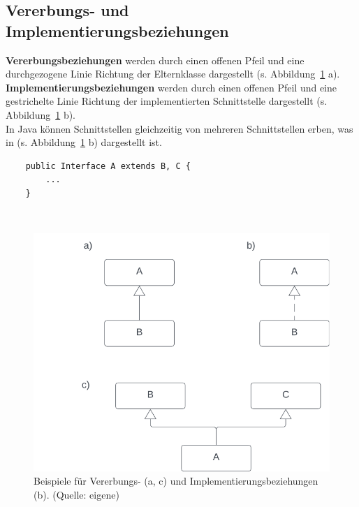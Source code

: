 \subsection{Vererbungs- und Implementierungsbeziehungen}

\textbf{Vererbungsbeziehungen} werden durch einen offenen Pfeil und eine durchgezogene Linie Richtung der Elternklasse dargestellt (s. Abbildung~\ref{fig:inheritance} a).\\

\textbf{Implementierungsbeziehungen} werden durch einen offenen Pfeil und eine gestrichelte Linie Richtung der implementierten Schnittstelle dargestellt (s. Abbildung~\ref{fig:inheritance} b).\\

In Java können Schnittstellen gleichzeitig von mehreren Schnittstellen erben, was in (s. Abbildung~\ref{fig:inheritance} b) dargestellt ist.\\

\begin{verbatim}
    public Interface A extends B, C {
        ...
    }
\end{verbatim}\\

\begin{figure}
    \centering
    \includegraphics[scale=0.5]{chapters/fopt3/img/inheritance}
    \caption{Beispiele für Vererbungs- (a, c) und Implementierungsbeziehungen (b). (Quelle: eigene)}
    \label{fig:inheritance}
\end{figure}


